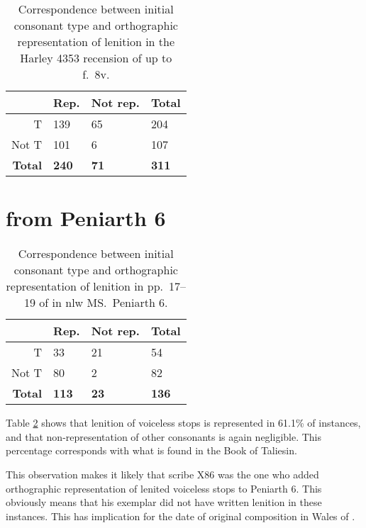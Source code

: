 \begin{table}[h]
\centering
\begin{tabular}{@{}rlll@{}}
\toprule
 & \textbf{Rep.} & \textbf{Not rep.} & \textbf{Total} \\ \midrule
T & 139 & 65 & 204 \\
Not T & 101 & 6 & 107 \\
\textbf{Total} & \textbf{240} & \textbf{71} & \textbf{311} \\ \bottomrule
\end{tabular}
\caption{Correspondence between initial consonant type and orthographic representation of lenition in the Harley 4353  recension of  up to f.\ 8v.}
\label{overviewharley4353}
\end{table}

\section{ from Peniarth 6}

\begin{table}[h]
\centering
\begin{tabular}{@{}rlll@{}}
\toprule
 & \textbf{Rep.} & \textbf{Not rep.} & \textbf{Total} \\ \midrule
T & 33 & 21 & 54 \\
Not T & 80 & 2 & 82 \\
\textbf{Total} & \textbf{113} & \textbf{23} & \textbf{136} \\ \bottomrule
\end{tabular}
\caption{Correspondence between initial consonant type and orthographic representation of lenition in pp.\ 17--19 of  in \gls{nlw} MS.\ Peniarth 6.}
\label{overviewgeraint}
\end{table}

Table \ref{overviewgeraint} shows that lenition of voiceless stops is represented in 61.1\% of instances, and that non-representation of other consonants is again negligible. This percentage corresponds with what is found in the Book of Taliesin. 

This observation makes it likely that scribe X86 was the one who added orthographic representation of lenited voiceless stops to Peniarth 6. This obviously means that his exemplar did not have written lenition in these instances. This has implication for the date of original composition in Wales of . 



